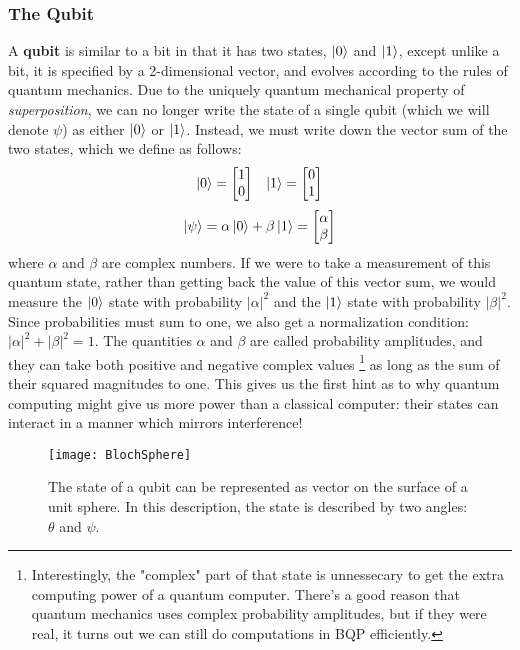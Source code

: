 \subsubsection{The Qubit}
A \textbf{qubit} is similar to a bit in that it has two states, $\ket{0}$ and $\ket{1}$, except unlike a bit, it is specified
by a 2-dimensional vector, and evolves according to the rules of quantum mechanics. Due to the uniquely quantum
mechanical property of \emph{superposition}, we can no longer write the state of a single qubit (which we will
denote $\psi$) as either $\ket{0}$ or $\ket{1}$. Instead, we must write down the vector sum of the two states,
which we define as follows:
\begin{align}
  \label{eqn:basisstates}
  \ket{0} = \begin{bmatrix}1\\0\end{bmatrix} && \ket{1} = \begin{bmatrix}0\\1\end{bmatrix}
\end{align}
\begin{equation}
  \ket{\psi} = \alpha \ket{0} + \beta \ket{1} = \begin{bmatrix}\alpha\\\beta\end{bmatrix}
\end{equation}
where $\alpha$ and $\beta$ are complex numbers. If we were to take a measurement of this quantum state,
rather than getting back the value of this vector sum, we would measure the $\ket{0}$ state with probability
$|\alpha|^2$ and the $\ket{1}$ state with probability $|\beta|^2$. Since probabilities must sum to one, we also
get a normalization condition: $|\alpha|^2 + |\beta|^2 = 1$. The quantities $\alpha$ and $\beta$ are called
probability amplitudes, and they can take both positive and negative complex values
\footnote{Interestingly, the "complex" part of that state is unnessecary to get the extra computing power
  of a quantum computer\cite{doi:10.1142/S0219749913500019}. There's a good reason that quantum mechanics
  uses complex probability amplitudes\cite{2004quant.ph..1062A}, but if they were real, it turns out
  we can still do computations in \textsc{BQP} efficiently.}
as long as the sum of their squared magnitudes to one. This gives us the first hint as to why quantum computing
might give us more power than a classical computer: their states can interact in a manner which mirrors
interference!

\begin{figure}
  \texttt{[image: BlochSphere]}
  \caption[The Bloch Sphere representation of a qubit]
  {The state of a qubit can be represented as vector on the surface of a unit sphere. In this description,
  the state is described by two angles: $\theta$ and $\psi$.}
  \label{fig:bloch}
\end{figure}

